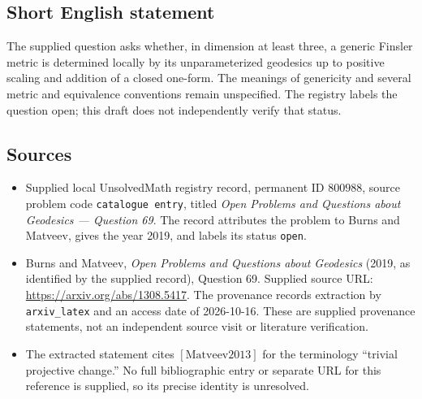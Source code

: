 \documentclass[11pt]{article}
\begin{document}
\subsection{Short English statement}
The supplied question asks whether, in dimension at least three, a generic Finsler metric is determined locally by its unparameterized geodesics up to positive scaling and addition of a closed one-form. The meanings of genericity and several metric and equivalence conventions remain unspecified. The registry labels the question open; this draft does not independently verify that status.
\subsection{Sources}
\begin{itemize}
\item Supplied local UnsolvedMath registry record, permanent ID \(800988\), source problem code \texttt{catalogue entry}, titled \emph{Open Problems and Questions about Geodesics --- Question 69}. The record attributes the problem to Burns and Matveev, gives the year 2019, and labels its status \texttt{open}.
\item Burns and Matveev, \emph{Open Problems and Questions about Geodesics} (2019, as identified by the supplied record), Question 69. Supplied source URL: \url{https://arxiv.org/abs/1308.5417}. The provenance records extraction by \texttt{arxiv\_latex} and an access date of 2026-10-16. These are supplied provenance statements, not an independent source visit or literature verification.
\item The extracted statement cites \([\mathrm{Matveev2013}]\) for the terminology ``trivial projective change.'' No full bibliographic entry or separate URL for this reference is supplied, so its precise identity is unresolved.
\end{itemize}
\end{document}
